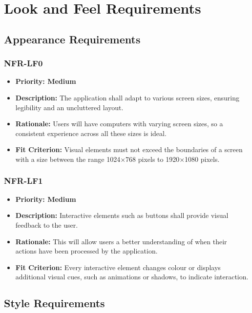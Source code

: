 \documentclass[12pt]{article}
\begin{document}
\normalsize

\section{Look and Feel Requirements}
\subsection{Appearance Requirements}
\subsubsection*{NFR-LF0}
\label{sec:LF0}
\begin{itemize}
  \item \textbf{Priority: Medium}
  \item \textbf{Description:} The application shall adapt to various screen sizes, ensuring legibility and an uncluttered layout.
  \item \textbf{Rationale:} Users will have computers with varying screen sizes, so a consistent experience across all these sizes is ideal.
  \item \textbf{Fit Criterion:} Visual elements must not exceed the boundaries of a screen with a size between the range 1024×768 pixels to 1920×1080 pixels.
\end{itemize}
\subsubsection*{NFR-LF1}
\label{sec:LF1}
\begin{itemize}
  \item \textbf{Priority: Medium}
  \item \textbf{Description:} Interactive elements such as buttons shall provide visual feedback to the user.
  \item \textbf{Rationale:} This will allow users a better understanding of when their actions have been processed by the application.
  \item \textbf{Fit Criterion:} Every interactive element changes colour or displays additional visual cues, such as animations or shadows, to indicate interaction.
\end{itemize}
\subsection{Style Requirements}
\end{document}
